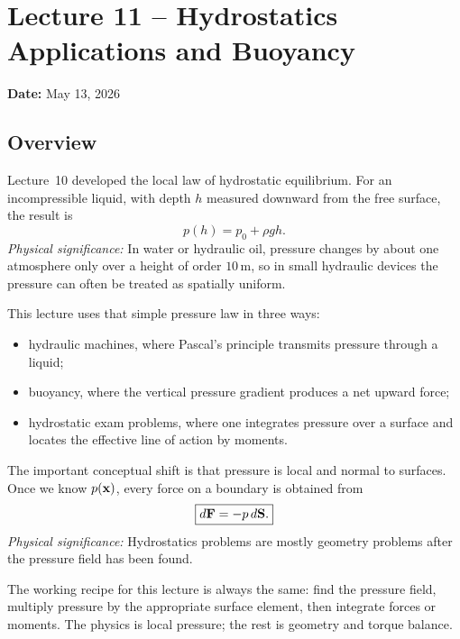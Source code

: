 \documentclass[../main.tex]{subfiles}
\begin{document}
\section{Lecture 11 -- Hydrostatics Applications and Buoyancy}\label{sec:lec11}
\date{May 13, 2026}
\begin{center}
  \textbf{Date:} May 13, 2026
\end{center}

\subsection*{Overview}
Lecture~10 developed the local law of hydrostatic equilibrium. For an incompressible liquid, with depth $h$ measured downward from the free surface, the result is
\begin{equation}
  \boxed{p(h)=p_0+\rho g h.}
  \label{eq:lec11_recall_hydrostatic_pressure}
\end{equation}
\textit{Physical significance:} In water or hydraulic oil, pressure changes by about one atmosphere only over a height of order $10\,\mathrm{m}$, so in small hydraulic devices the pressure can often be treated as spatially uniform.

This lecture uses that simple pressure law in three ways:
\begin{itemize}
  \item hydraulic machines, where Pascal's principle transmits pressure through a liquid;
  \item buoyancy, where the vertical pressure gradient produces a net upward force;
  \item hydrostatic exam problems, where one integrates pressure over a surface and locates the effective line of action by moments.
\end{itemize}

The important conceptual shift is that pressure is local and normal to surfaces. Once we know $p(\mathbf{x})$, every force on a boundary is obtained from
\begin{equation}
  \boxed{d\mathbf{F}=-p\,d\mathbf{S}.}
  \label{eq:lec11_pressure_surface_force}
\end{equation}
\textit{Physical significance:} Hydrostatics problems are mostly geometry problems after the pressure field has been found.

\begin{note}
The working recipe for this lecture is always the same: find the pressure field, multiply pressure by the appropriate surface element, then integrate forces or moments. The physics is local pressure; the rest is geometry and torque balance.
\end{note}
\end{document}
